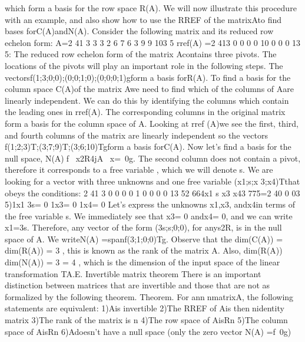 {{{{{{{which form a basis for the row space R\left(A\right). We will now illustrate this
procedure with an example, and also show how to use the RREF of the
matrixAto ﬁnd bases forC\left(A\right)andN\left(A\right).
Consider the following matrix and its reduced row echelon form:
A=2
41 3 3 3
2 6 7 6
3 9 9 103
5 rref\left(A\right) =2
413 0 0
0 0 10
0 0 0 13
5:
The reduced row echelon form of the matrix Acontains three pivots. The
locations of the pivots will play an important role in the following steps.
The vectorsf\left(1;3;0;0\right);\left(0;0;1;0\right);\left(0;0;0;1\right)gform a basis forR\left(A\right).
To ﬁnd a basis for the column space C\left(A\right)of the matrix Awe need
to ﬁnd which of the columns of Aare linearly independent. We can
do this by identifying the columns which contain the leading ones in
rref\left(A\right). The corresponding columns in the original matrix form a basis
for the column space of A. Looking at rref \left(A\right)we see the ﬁrst, third,
and fourth columns of the matrix are linearly independent so the vectors
f\left(1;2;3\right)T;\left(3;7;9\right)T;\left(3;6;10\right)Tgform a basis forC\left(A\right).
Now let’s ﬁnd a basis for the null space, N\left(A\right)f~ x2R4jA~ x=~0g.
The second column does not contain a pivot, therefore it corresponds to a
free variable , which we will denote s. We are looking for a vector with three
unknowns and one free variable \left(x1;s;x 3;x4\right)Tthat obeys the conditions:
2
41 3 0 0
0 0 1 0
0 0 0 13
52
664x1
s
x3
x43
775=2
40
0
03
5\right)1x1\+ 3s= 0
1x3= 0
1x4= 0
Let’s express the unknowns x1,x3, andx4in terms of the free variable s.
We immediately see that x3= 0 andx4= 0, and we can write x1= 3s.
Therefore, any vector of the form \left( 3s;s;0;0\right), for anys2R, is in the
null space of A. We writeN\left(A\right) =spanf\left( 3;1;0;0\right)Tg.
Observe that the dim\left(C\left(A\right)\right) = dim\left(R\left(A\right)\right) = 3 , this is known as the
rank of the matrix A. Also, dim\left(R\left(A\right)\right) \+ dim\left(N\left(A\right)\right) = 3  = 4 ,
which is the dimension of the input space of the linear transformation TA.E. Invertible matrix theorem
There is an important distinction between matrices that are invertible and
those that are not as formalized by the following theorem.
Theorem. For annnmatrixA, the following statements are equivalent:
1\right)Ais invertible
2\right)The RREF of Ais thennidentity matrix
3\right)The rank of the matrix is n
4\right)The row space of AisRn
5\right)The column space of AisRn
6\right)Adoesn’t have a null space \left(only the zero vector N\left(A\right) =f~0g\right)
}}}}}}}
